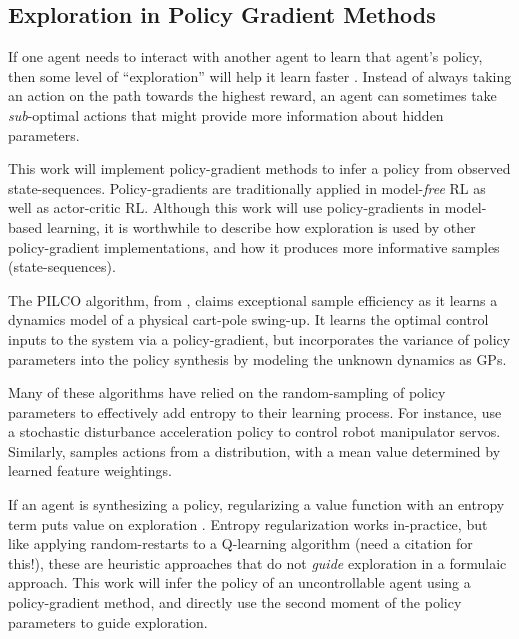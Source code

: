 \subsection{Exploration in Policy Gradient Methods}

    If one agent needs to interact with another agent to learn that agent's policy, then some level of ``exploration''
    will help it learn faster \cite{nachum2017bridging}. Instead of always taking an action on the path towards the
    highest reward, an agent can sometimes take \emph{sub}-optimal actions that might provide more information about
    hidden parameters.

    This work will implement policy-gradient methods to infer a policy from observed state-sequences. Policy-gradients
    \cite{williams1992simple} are traditionally applied in model-\emph{free} \ac{RL} as well as actor-critic \ac{RL}.
    Although this work will use policy-gradients in model-based learning, it is worthwhile to describe how exploration
    is used by other policy-gradient implementations, and how it produces more informative samples (state-sequences).


    The PILCO algorithm, from \cite{deisenroth2011pilco}, claims exceptional sample efficiency as it learns a dynamics
    model of a physical cart-pole swing-up. It learns the optimal control inputs to the system via a policy-gradient,
    but incorporates the variance of policy parameters into the policy synthesis by modeling the unknown dynamics as
    \acp{GP}.

    Many of these algorithms have relied on the random-sampling of policy parameters to effectively add entropy to their
    learning process. For instance, \cite{peters2008reinforcement} use a stochastic disturbance acceleration policy to
    control robot manipulator servos. Similarly, \cite{sehnke2010parameter} samples actions from a distribution, with a
    mean value determined by learned feature weightings.

    If an agent is synthesizing a policy, regularizing a value function with an entropy term puts value on exploration
    \cite{nachum2017bridging}. Entropy regularization works in-practice, but like applying random-restarts to a
    Q-learning algorithm \color{blue}(need a citation for this!)\color{black}, these are heuristic approaches that do
    not \textit{guide} exploration in a formulaic approach. This work will infer the policy of an uncontrollable agent
    using a policy-gradient method, and directly use the second moment of the policy parameters to guide exploration.


